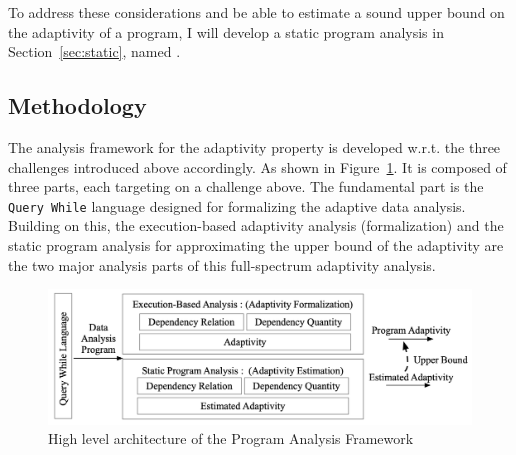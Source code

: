 \begin{enumerate}
To address these considerations and be able to estimate a sound upper bound on the adaptivity of a program, 
I will develop a static program analysis in Section~\ref{sec:static}, named {\THESYSTEM}.
\end{enumerate}%


\subsection{Methodology}
\label{subsec:intro-adapt}
The analysis framework for the adaptivity property is 
developed w.r.t. the three challenges introduced above accordingly.
As shown in Figure~\ref{fig:structure}.
It is composed of three parts, each targeting on a challenge above.
The fundamental part is the {\tt Query While} language designed for formalizing the 
adaptive data analysis. Building on this, 
the execution-based adaptivity analysis (formalization)
and the static program analysis for approximating the upper bound of the 
adaptivity are the two major analysis parts of this full-spectrum adaptivity analysis.
\begin{figure}
   \centering   
   \includegraphics[width=1.0\textwidth]{figures/overview.png}
  \caption{High level architecture of the Program Analysis Framework}
   \label{fig:structure}
\end{figure}

